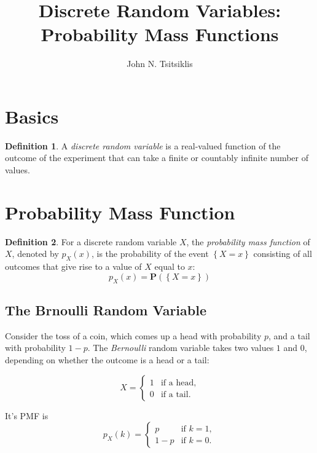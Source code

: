 \documentclass{tufte-handout}
\author{John N. Tsitsiklis}
\title{Discrete Random Variables: Probability Mass Functions}
\theoremstyle{definition} \newtheorem{definition}{Definition}
\theoremstyle{definition} \newtheorem{remark}{Remark}
\theoremstyle{definition} \newtheorem{example}{Example}
\newcommand{\prob}[1]{\mathbf{P}\left(#1\right)}
\newcommand{\pmf}[2]{p_#1\left(#2\right)}
\begin{document}
\maketitle
\section{Basics}
\begin{definition}
  A \emph{discrete random variable} is a real-valued function of the
  outcome of the experiment that can take a finite or countably infinite
  number of values.
\end{definition}

\section{Probability Mass Function}
\begin{definition}
  For a discrete random variable $X$, the \emph{probability mass function}
  of $X$, denoted by $\pmf{X}{x}$, is the probability of the event
  $\left\{ X = x \right\}$ consisting of all outcomes that give rise to a value of
  $X$ equal to $x$:
  \begin{equation*}
    \pmf{X}{x} = \prob{\left\{ X = x \right\}}
  \end{equation*}
\end{definition}

\subsection{The Brnoulli Random Variable}
Consider the toss of a coin, which comes up a head with probability $p$,
and a tail with probability $1 - p$. The \emph{Bernoulli} random
variable takes two values $1$ and $0$, depending on whether the outcome
is a head or a tail:

\begin{equation*}
  X =
  \begin{cases}
    1 & \text{if a head},\\
    0 & \text{if a tail}.
  \end{cases}
\end{equation*}

It's PMF is
\begin{equation*}
  \pmf{X}{k} =
  \begin{cases}
    p & \text{if } k = 1,\\
    1 - p & \text{if } k = 0.
  \end{cases}
\end{equation*}
\end{document}

